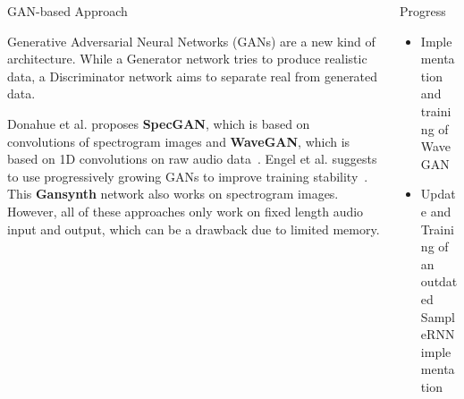 \documentclass[final,hyperref={pdfpagelabels=false}]{beamer}
\newcommand{\blocktextwidth}{0.93\textwidth}
\begin{document}
\begin{frame}[t]
\begin{columns}[t]
\begin{column}{0.6375\textwidth}
\begin{columns}[T]
\begin{column}{0.486\textwidth}





\begin{block}{GAN-based Approach}
\begin{minipage}[]{\blocktextwidth}
Generative Adversarial Neural Networks (GANs) are a new kind of architecture.
While a Generator network tries to produce realistic data, a Discriminator network aims to separate real from generated data.

Donahue et al. proposes \textbf{SpecGAN}, which is based on convolutions of spectrogram images and \textbf{WaveGAN}, which is based on 1D convolutions on raw audio data~\cite{donahue2018adversarial}.
Engel et al. suggests to use progressively growing GANs to improve training stability~\cite{engel2019gansynth}.
This \textbf{Gansynth} network also works on spectrogram images.
However, all of these approaches only work on fixed length audio input and output, which can be a drawback due to limited memory.

\end{minipage}
\end{block}





\end{column}

\hfill


\begin{column}{0.486\textwidth}




\begin{block}{Progress}
\begin{minipage}[]{\blocktextwidth}
\begin{itemize}[leftmargin=*,labelindent=0pt,label={\color{black!40}$\bullet$}]
\item{Implementation and training of WaveGAN}
\item{Update and Training of an outdated \mbox{SampleRNN} implementation}
\end{itemize}
\end{minipage}
\end{block}


\end{column}
\end{columns}
\end{column}
\end{columns}
\end{frame}
\end{document}
